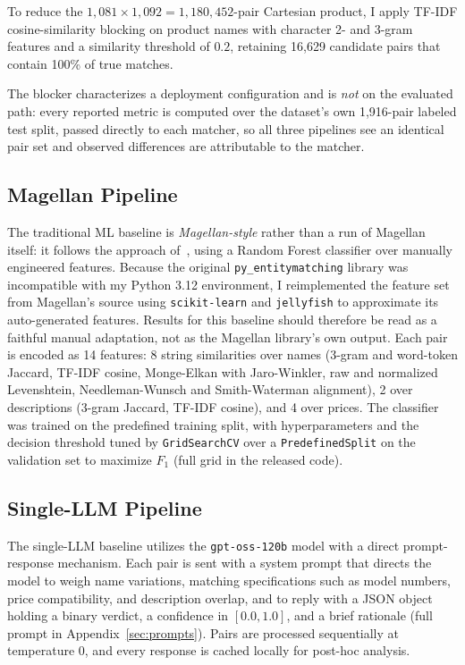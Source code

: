 \documentclass[sigconf]{acmart}
\begin{document}
To reduce the $1{,}081 \times 1{,}092 = 1{,}180{,}452$-pair Cartesian product, I apply TF-IDF cosine-similarity blocking on product names with character 2- and 3-gram features and a similarity threshold of $0.2$, retaining 16,629 candidate pairs that contain 100\% of true matches.

The blocker characterizes a deployment configuration and is \emph{not} on the evaluated path: every reported metric is computed over the dataset's own 1,916-pair labeled test split, passed directly to each matcher, so all three pipelines see an identical pair set and observed differences are attributable to the matcher.

\subsection{Magellan Pipeline}
The traditional ML baseline is \emph{Magellan-style} rather than a run of Magellan itself: it follows the approach of~\cite{konda2016magellan}, using a Random Forest classifier over manually engineered features.
Because the original \texttt{py\_entitymatching} library was incompatible with my Python 3.12 environment, I reimplemented the feature set from Magellan's source using \texttt{scikit-learn} and \texttt{jellyfish} to approximate its auto-generated features. Results for this baseline should therefore be read as a faithful manual adaptation, not as the Magellan library's own output.
Each pair is encoded as 14 features: 8 string similarities over names (3-gram and word-token Jaccard, TF-IDF cosine, Monge-Elkan with Jaro-Winkler, raw and normalized Levenshtein, Needleman-Wunsch and Smith-Waterman alignment), 2 over descriptions (3-gram Jaccard, TF-IDF cosine), and 4 over prices.
The classifier was trained on the predefined training split, with hyperparameters and the decision threshold tuned by \texttt{GridSearchCV} over a \texttt{PredefinedSplit} on the validation set to maximize $F_1$ (full grid in the released code).

\subsection{Single-LLM Pipeline}
The single-LLM baseline utilizes the \texttt{gpt-oss-120b} model with a direct prompt-response mechanism.
Each pair is sent with a system prompt that directs the model to weigh name variations, matching specifications such as model numbers, price compatibility, and description overlap, and to reply with a JSON object holding a binary verdict, a confidence in $[0.0, 1.0]$, and a brief rationale (full prompt in Appendix~\ref{sec:prompts}).
Pairs are processed sequentially at temperature 0, and every response is cached locally for post-hoc analysis.
\end{document}
